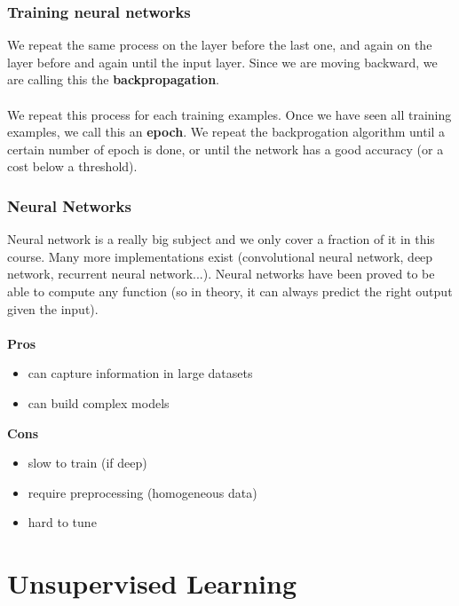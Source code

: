 \documentclass{beamer}
\begin{document}
\begin{frame}
  \frametitle{Training neural networks}
  We repeat the same process on the layer before the last one, and again on the
  layer before and again until the input layer. Since we are moving backward, we are
  calling this the \textbf{backpropagation}.\\~\\

  We repeat this process for each training examples. Once we have seen all
  training examples, we call this an \textbf{epoch}. We repeat the backprogation
  algorithm until a certain number of epoch is done, or until the network has a
  good accuracy (or a cost below a threshold).
\end{frame}

\begin{frame}
  \frametitle{Neural Networks}
  Neural network is a really big subject and we only cover a fraction of it in
  this course. Many more implementations exist (convolutional neural network,
  deep network, recurrent neural network...). Neural networks have been proved
  to be able to compute any function (so in theory, it can always predict the
  right output given the input).
  \\~\\
  \textbf{Pros}
  \begin{itemize}
    \item can capture information in large datasets
    \item can build complex models
  \end{itemize}

  \textbf{Cons}
  \begin{itemize}
    \item slow to train (if deep)
    \item require preprocessing (homogeneous data)
    \item hard to tune
  \end{itemize}
\end{frame}


\section{Unsupervised Learning}

\end{document}
